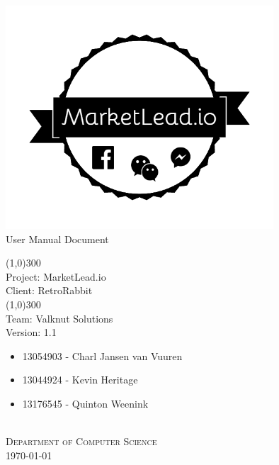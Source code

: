 \documentclass{article}
\begin{document}
	\begin{titlepage}
		\begin{center}
			\includegraphics[width=10cm]{images/logo.png}  \\
			[0.5cm]
			\huge{
			User Manual Document\\
			}
			
			\line(1,0){300}\\
			[0.2cm]
			\LARGE{Project: MarketLead.io\\
			Client: RetroRabbit} \\
			\line(1,0){300}\\
			\LARGE{Team: Valknut Solutions}\\
			[1.0cm]
			\large{Version: 1.1}\\
			[1.0cm]
			\large
			{
			\begin{itemize}
				\item 13054903 - Charl Jansen van Vuuren    
				\item 13044924 - Kevin Heritage
				\item 13176545 - Quinton Weenink\\
			\end{itemize}
			}
			\textsc{\large}\\
		[3.0cm]
		\textsc{\large  Department of Computer Science}\\
		[0.5cm]
		\textsc{\large \today}\\
		\end{center}
	\end{titlepage}
	
	\cleardoublepage
	\begin{versionhistory}
	\end{versionhistory}	
	
\end{document}
